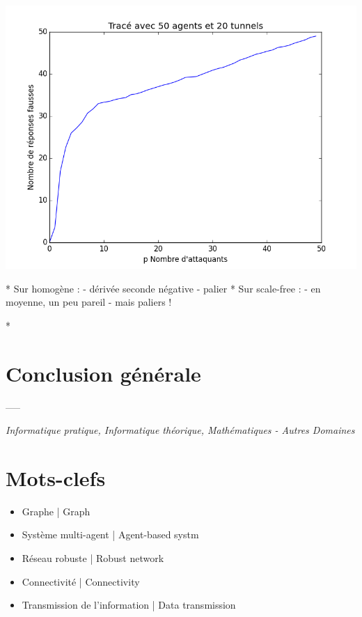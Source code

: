 \documentclass[11pt,a4paper]{article}
\begin{document}
\includegraphics[scale=0.3]{../resultats/atkaleat/atkaleat-50-20-1.png} 
	
	* Sur homogène :
	  - dérivée seconde négative 
	  - palier
	* Sur scale-free :
	  - en moyenne, un peu pareil
	  - mais paliers !
	
	* 


\section{Conclusion générale} %




-----



%

\emph{Informatique pratique, Informatique théorique, Mathématiques - Autres Domaines}


\section{Mots-clefs}

%
%

\begin{it}
\begin{itemize}
	\item Graphe | Graph
	\item Système multi-agent | Agent-based systm
	\item Réseau robuste | Robust network
	\item Connectivité | Connectivity
	\item Transmission de l'information | Data transmission
\end{itemize}
\end{it}
\end{document}
